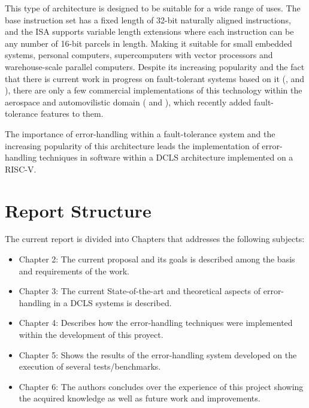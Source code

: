 \documentclass[10pt, a4paper]{report}
\begin{document}
This type of architecture is designed to be suitable for a wide range of uses.
The base instruction set has a fixed length of 32-bit naturally aligned
instructions, and the \acrshort{ISA} supports variable length extensions where
each instruction can be any number of 16-bit parcels in length. Making it
suitable for small embedded systems, personal computers, supercomputers with
vector processors and warehouse-scale parallel computers. Despite its increasing
popularity and the fact that there is current work in progress on fault-tolerant
systems based on it (\cite{soft_core_riscv_sram_radiation}, 
\cite{heterogeneus_fault_tolerance_riscv} and 
\cite{low_cost_fault_tolerant_riscv}), there are only a few commercial 
implementations of this technology within the aerospace and automovilistic 
domain (\cite{noelv_page} and \cite{catapult_page}), which recently added
fault-tolerance features to them. 

The importance of error-handling within a fault-tolerance system and the
increasing popularity of this architecture leads the implementation of
error-handling techniques in software within a \acrshort{DCLS} architecture
implemented on a RISC-V.

\section{Report Structure}

The current report is divided into Chapters that addresses the following
subjects:

\begin{itemize}
    \item Chapter 2: The current proposal and its goals is described among the
        basis and requirements of the work.
    \item Chapter 3: The current State-of-the-art and theoretical aspects of 
        error-handling in a \acrshort{DCLS} systems is described.
    \item Chapter 4: Describes how the error-handling techniques were
        implemented within the development of this proyect.
    \item Chapter 5: Shows the results of the error-handling system developed on
        the execution of several tests/benchmarks.
    \item Chapter 6: The authors concludes over the experience of this project
        showing the acquired knowledge as well as future work and improvements.
\end{itemize}
\end{document}
